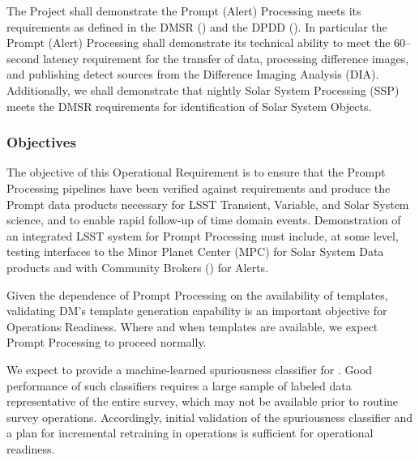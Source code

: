 The Project shall demonstrate the Prompt (Alert) Processing meets its requirements as defined in the DMSR () and the DPDD ().  In particular the Prompt (Alert) Processing shall demonstrate its technical ability to meet the 60--second latency requirement for the transfer of data, processing difference images, and publishing detect sources from the Difference Imaging Analysis (DIA).
Additionally, we shall demonstrate that nightly Solar System Processing (SSP) meets the DMSR requirements for identification of Solar System Objects.

\subsubsection{Objectives} 
The objective of this Operational Requirement is to ensure that the Prompt Processing pipelines have been verified against requirements and produce the Prompt data products necessary for LSST Transient, Variable, and Solar System science, and to enable rapid follow-up of time domain events. 
Demonstration of an integrated LSST system for Prompt Processing must include, at some level, testing interfaces to the Minor Planet Center (MPC) for Solar System Data products and with Community Brokers () for Alerts. 

Given the dependence of Prompt Processing on the availability of templates, validating DM's template generation capability is an important objective for Operations Readiness. 
Where and when templates are available, we expect Prompt Processing to proceed normally.


We expect to provide a machine-learned spuriousness classifier for \DIASources.
Good performance of such classifiers requires a large sample of labeled data representative of the entire survey, which may not be available prior to routine survey operations.
Accordingly, initial validation of the spuriousness classifier and a plan for incremental retraining in operations is sufficient for operational readiness.

